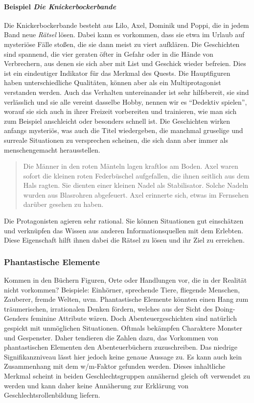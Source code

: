 \paragraph{Beispiel \emph{Die Knickerbockerbande}}

Die Knickerbockerbande besteht aus Lilo, Axel, Dominik und Poppi, die in
jedem Band neue \emph{Rätsel} lösen. Dabei kann es vorkommen, dass sie
etwa im Urlaub auf mysteriöse Fälle stoßen, die sie dann meist zu viert
aufklären. Die Geschichten sind spannend, die vier geraten öfter in
Gefahr oder in die Hände von Verbrechern, aus denen sie sich aber mit
List und Geschick wieder befreien. Dies ist ein eindeutiger Indikator
für das Merkmal des Quests. Die Hauptfiguren haben unterschiedliche
Qualitäten, können aber als ein Multiprotagonist verstanden werden. Auch
das Verhalten untereinander ist sehr hilfsbereit, sie sind verlässlich
und sie alle vereint dasselbe Hobby, nennen wir es ``Dedektiv spielen'',
worauf sie sich auch in ihrer Freizeit vorbereiten und trainieren, wie
man sich zum Beispiel anschleicht oder besonders schnell ist. Die
Geschichten wirken anfangs mysteriös, was auch die Titel wiedergeben,
die manchmal gruselige und surreale Situationen zu versprechen scheinen,
die sich dann aber immer als menschengemacht herausstellen.
\blockcquote[117]{Brezina2010}{Die Männer in den roten Mänteln lagen kraftlos am Boden. \textelp{}  Axel waren sofort die kleinen roten Federbüschel aufgefallen, die ihnen seitlich aus dem Hals ragten. Sie dienten einer kleinen Nadel als Stabilisator. Solche Nadeln wurden aus Blasrohren abgefeuert. Axel erinnerte sich, etwas im Fernsehen darüber gesehen zu haben.}
Die Protagonisten agieren sehr rational. Sie können Situationen gut
einschätzen und verknüpfen das Wissen aus anderen Informationsquellen
mit dem Erlebten. Diese Eigenschaft hilft ihnen dabei die Rätsel zu
lösen und ihr Ziel zu erreichen.

\subsubsection{Phantastische Elemente}

Kommen in den Büchern Figuren, Orte oder Handlungen vor, die in der
Realität nicht vorkommen? Beispiele: Einhörner, sprechende Tiere,
fliegende Menschen, Zauberer, fremde Welten, uvm. Phantastische Elemente
könnten einen Hang zum träumerischen, irrationalen Denken fördern,
welches aus der Sicht des Doing-Genders feminine Attribute wären. Doch
Abenteuergeschichten sind natürlich gespickt mit unmöglichen
Situationen. Oftmals bekämpfen Charaktere Monster und Gespenster. Daher
tendieren die Zahlen dazu, das Vorkommen von phantastischen Elementen
den Abenteuerbüchern zuzuschreiben. Das niedrige Signifikanzniveau lässt
hier jedoch keine genaue Aussage zu. Es kann auch kein Zusammenhang mit
dem w/m-Faktor gefunden werden. Dieses inhaltliche Merkmal scheint in
beiden Geschlechtsgruppen annähernd gleich oft verwendet zu werden und
kann daher keine Annäherung zur Erklärung von Geschlechtsrollenbildung
liefern.

